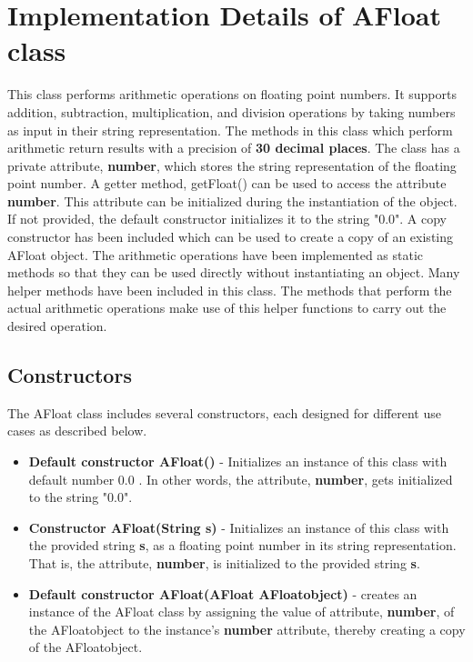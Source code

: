 \documentclass[a4paper,12pt]{article}
\begin{document}
\section{Implementation Details of AFloat class}
This class performs arithmetic operations on floating point numbers. It supports addition, subtraction, multiplication, and division operations by taking numbers as input in their string representation. The methods in this class which perform arithmetic return results with a precision of \textbf{30 decimal places}. The class has a private attribute, \textbf{number}, which stores the string representation of the floating point number. A getter method, getFloat() can be used to access the attribute \textbf{number}. This attribute can be initialized during the instantiation of the object. If not provided, the default constructor initializes it to the string "$0.0$". A copy constructor has been included which can be used to create a copy of an existing AFloat object. The arithmetic operations have been implemented as static methods so that they can be used directly without instantiating an object. Many helper methods have been included in this class. The methods that perform the actual arithmetic operations make use of this helper functions to carry out the desired operation.

\subsection{Constructors}
The AFloat class includes several constructors, each designed for different use cases as described below.

\begin{itemize}
    \item \textbf{Default constructor AFloat()} - Initializes an instance of this class with default number $0.0$ . In other words, the attribute, \textbf{number}, gets initialized to the string "$0.0$".
    \item \textbf{Constructor AFloat(String s)} - Initializes an instance of this class with the provided string \textbf{s}, as a floating point number in its string representation. That is, the attribute, \textbf{number}, is initialized to the provided string \textbf{s}.
    \item \textbf{Default constructor AFloat(AFloat AFloatobject)} - creates an instance of the AFloat class by assigning the value of attribute, \textbf{number}, of the AFloatobject to the instance's \textbf{number} attribute, thereby creating a copy of the AFloatobject.
\end{itemize}
\end{document}
